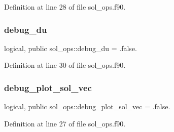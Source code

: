 Definition at line 28 of file sol\+\_\+ops.\+f90.

\mbox{\label{namespacesol__ops_acb6465b87495933920896a52b4298a4c}} 
\subsubsection{\texorpdfstring{debug\+\_\+du}{debug\_du}}
{\footnotesize\ttfamily logical, public sol\+\_\+ops\+::debug\+\_\+du = .false.}



Definition at line 30 of file sol\+\_\+ops.\+f90.

\mbox{\label{namespacesol__ops_ae0df0d66ef4ea0155cfbeb23973c28ac}} 
\subsubsection{\texorpdfstring{debug\+\_\+plot\+\_\+sol\+\_\+vec}{debug\_plot\_sol\_vec}}
{\footnotesize\ttfamily logical, public sol\+\_\+ops\+::debug\+\_\+plot\+\_\+sol\+\_\+vec = .false.}



Definition at line 27 of file sol\+\_\+ops.\+f90.

